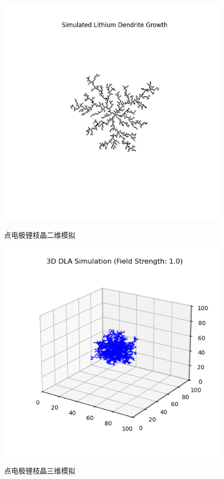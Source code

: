 \documentclass{article}
\begin{document}
\begin{figure}[H]
\begin{minipage}{0.32\textwidth}
       \end{minipage}
                \hfill %
                \begin{minipage}{0.32\textwidth}
                    \centering
                    \includegraphics[scale=0.35]{figs/10.png}
                    \caption{点电极锂枝晶二维模拟}
                \end{minipage}
                \hfill %
                \begin{minipage}{0.32\textwidth}
                   \centering
                  \includegraphics[scale=0.4]{figs/8.png}

                   \caption{点电极锂枝晶三维模拟}
                \end{minipage}
       \end{figure}      
\end{document}
